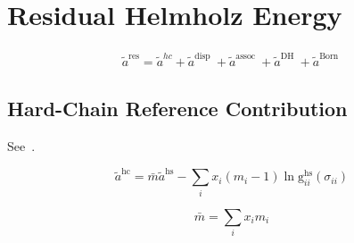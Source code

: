 \documentclass[12pt, letterpaper]{article}
\begin{document}
\section{Residual Helmholz Energy}


\begin{align}
    \tilde{a}^{\mathrm{res}}=\tilde{a}^{h c}+\tilde{a}^{\text {disp }}+\tilde{a}^{\text {assoc }}+\tilde{a}^{\text {DH }}+\tilde{a}^{\text {Born }}
    \label{eq:ares_total}
\end{align}

\subsection{Hard-Chain Reference Contribution}


See~\cite{Gross2001}.

\begin{equation}
    \tilde{a}^{\mathrm{hc}}=\bar{m} \tilde{a}^{\mathrm{hs}}-\sum_{i} x_{i}\left(m_{i}-1\right) \ln \mathrm{g}_{i i}^{\mathrm{hs}}\left(\sigma_{i i}\right)
    \label{eq:ares_hc}
\end{equation}


\begin{equation}
    \bar{m}=\sum_{i} x_{i} m_{i}
    \label{eq:m_bar}
\end{equation}

\end{document}
